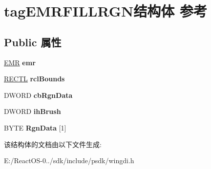 \hypertarget{structtag_e_m_r_f_i_l_l_r_g_n}{}\section{tag\+E\+M\+R\+F\+I\+L\+L\+R\+G\+N结构体 参考}
\label{structtag_e_m_r_f_i_l_l_r_g_n}
\subsection*{Public 属性}
\begin{DoxyCompactItemize}
\item 
\mbox{\label{structtag_e_m_r_f_i_l_l_r_g_n_ad848791224fb166b3699221602cabdda}} 
\hyperlink{structtag_e_m_r}{E\+MR} {\bfseries emr}
\item 
\mbox{\label{structtag_e_m_r_f_i_l_l_r_g_n_ad65edfad5efa9f4d6b2912531ce014b8}} 
\hyperlink{struct___r_e_c_t_l}{R\+E\+C\+TL} {\bfseries rcl\+Bounds}
\item 
\mbox{\label{structtag_e_m_r_f_i_l_l_r_g_n_aa904eb7bd8fc10851f0cbeb57bdbfbed}} 
D\+W\+O\+RD {\bfseries cb\+Rgn\+Data}
\item 
\mbox{\label{structtag_e_m_r_f_i_l_l_r_g_n_af05b657e0e99cf1239815fdd88032dcd}} 
D\+W\+O\+RD {\bfseries ih\+Brush}
\item 
\mbox{\label{structtag_e_m_r_f_i_l_l_r_g_n_a8f1c95f63cdaed1b8f4fd8cbe8aa62ec}} 
B\+Y\+TE {\bfseries Rgn\+Data} \mbox{[}1\mbox{]}
\end{DoxyCompactItemize}


该结构体的文档由以下文件生成\+:\begin{DoxyCompactItemize}
\item 
E\+:/\+React\+O\+S-\/0../sdk/include/psdk/wingdi.\+h\end{DoxyCompactItemize}
